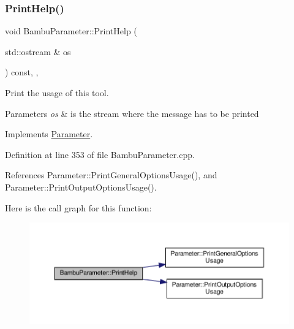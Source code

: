 \subsubsection{\texorpdfstring{Print\+Help()}{PrintHelp()}}
{\footnotesize\ttfamily void Bambu\+Parameter\+::\+Print\+Help (\begin{DoxyParamCaption}\item[{std\+::ostream \&}]{os }\end{DoxyParamCaption}) const\hspace{0.3cm}{\ttfamily [override]}, {\ttfamily [private]}, {\ttfamily [virtual]}}



Print the usage of this tool. 


\begin{DoxyParams}{Parameters}
{\em os} & is the stream where the message has to be printed \\
\hline
\end{DoxyParams}


Implements \hyperlink{classParameter_a804e04bcbc2eca07deed52e112fa3321}{Parameter}.



Definition at line 353 of file Bambu\+Parameter.\+cpp.



References Parameter\+::\+Print\+General\+Options\+Usage(), and Parameter\+::\+Print\+Output\+Options\+Usage().

Here is the call graph for this function\+:
\nopagebreak
\begin{figure}[H]
\begin{center}
\leavevmode
\includegraphics[width=350pt]{d4/d67/classBambuParameter_a1bdb53362203ada5ee2dc62f66e4bae8_cgraph}
\end{center}
\end{figure}
\mbox{\label{classBambuParameter_a7e11c45aaee781a23dbc3850f8a682e1}} 
